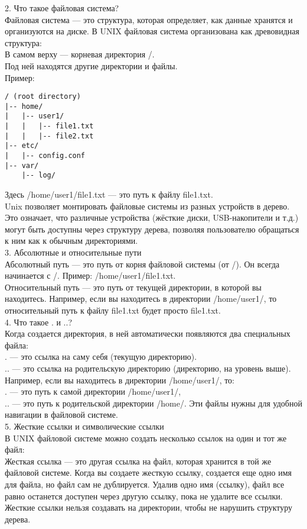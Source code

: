 2. Что такое файловая система? \\
Файловая система — это структура, которая определяет, как данные хранятся и организуются на диске. В UNIX файловая система организована как древовидная структура: \\
В самом верху — корневая директория /. \\
Под ней находятся другие директории и файлы. \\
Пример: \\
\begin{lstlisting}
/ (root directory)
|-- home/
|   |-- user1/
|   |   |-- file1.txt
|   |   |-- file2.txt
|-- etc/
|   |-- config.conf
|-- var/
    |-- log/
\end{lstlisting}
Здесь /home/user1/file1.txt — это путь к файлу file1.txt. \\
Unix позволяет монтировать файловые системы из разных устройств в дерево. Это означает, что различные устройства (жёсткие диски, USB-накопители и т.д.) могут быть доступны через структуру дерева, позволяя пользователю обращаться к ним как к обычным директориями. \\
3. Абсолютные и относительные пути \\
Абсолютный путь — это путь от корня файловой системы (от /). Он всегда начинается с /. Пример: /home/user1/file1.txt. \\
Относительный путь — это путь от текущей директории, в которой вы находитесь. Например, если вы находитесь в директории /home/user1/, то относительный путь к файлу file1.txt будет просто file1.txt. \\
4. Что такое . и ..? \\
Когда создается директория, в ней автоматически появляются два специальных файла: \\
. — это ссылка на саму себя (текущую директорию). \\
.. — это ссылка на родительскую директорию (директорию, на уровень выше). \\
Например, если вы находитесь в директории /home/user1/, то: \\
. — это путь к самой директории /home/user1/, \\
.. — это путь к родительской директории /home/. Эти файлы нужны для удобной навигации в файловой системе. \\
5. Жесткие ссылки и символические ссылки \\
В UNIX файловой системе можно создать несколько ссылок на один и тот же файл: \\
Жесткая ссылка — это другая ссылка на файл, которая хранится в той же файловой системе. Когда вы создаете жесткую ссылку, создается еще одно имя для файла, но файл сам не дублируется. Удалив одно имя (ссылку), файл все равно останется доступен через другую ссылку, пока не удалите все ссылки. Жесткие ссылки нельзя создавать на директории, чтобы не нарушить структуру дерева. \\
